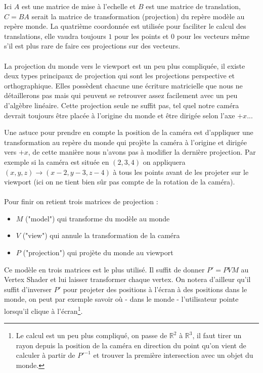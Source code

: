 \documentclass{EPUProjetDi}
\begin{document}
Ici $A$ est une matrice de mise à l'echelle et $B$ est une matrice de translation, $C=BA$ serait la matrice de transformation (projection) du repère modèle au repère monde. La quatrième coordonnée est utilisée pour faciliter le calcul des translations, elle vaudra toujours $1$ pour les points et $0$ pour les vecteurs même s'il est plus rare de faire ces projections sur des vecteurs.


\paragraph{}
La projection du monde vers le viewport est un peu plus compliquée, il existe deux types principaux de projection qui sont les projections perspective et orthographique. Elles possèdent chacune une écriture matricielle que nous ne détaillerons pas mais qui peuvent se retrouver assez facilement avec un peu d'algèbre linéaire. Cette projection seule ne suffit pas, tel quel notre caméra devrait toujours être placée à l'origine du monde et être dirigée selon l'axe $+x$...
\par
Une astuce pour prendre en compte la position de la caméra est d'appliquer une transformation au repère du monde qui projète la caméra à l'origine et dirigée vers $+x$, de cette manière nous n'avons pas à modifier la dernière projection. Par exemple si la caméra est située en $(2,3,4)$ on appliquera $(x,y,z)\rightarrow(x-2,y-3,z-4)$ à tous les points avant de les projeter sur le viewport (ici on ne tient bien sûr pas compte de la rotation de la caméra).

\paragraph{}
Pour finir on retient trois matrices de projection :
\begin{itemize}
	\item{$M$ ("model") qui transforme du modèle au monde}
	\item{$V$ ("view") qui annule la transformation de la caméra}
	\item{$P$ ("projection") qui projète du monde au viewport}
\end{itemize}

Ce modèle en trois matrices est le plus utilisé. Il suffit de donner $P'=PVM$ au Vertex Shader et lui laisser transformer chaque vertex. On notera d'ailleur qu'il suffit d'inverser $P'$ pour projeter des positions à l'écran à des positions dans le monde, on peut par exemple savoir où - dans le monde - l'utilisateur pointe lorsqu'il clique à l'écran\footnote{Le calcul est un peu plus compliqué, on passe de $\mathbb{R}^2$ à $\mathbb{R}^3$, il faut tirer un rayon depuis la position de la caméra en direction du point qu'on vient de calculer à partir de $P'^{-1}$ et trouver la première intersection avec un objet du monde.}.
\end{document}
